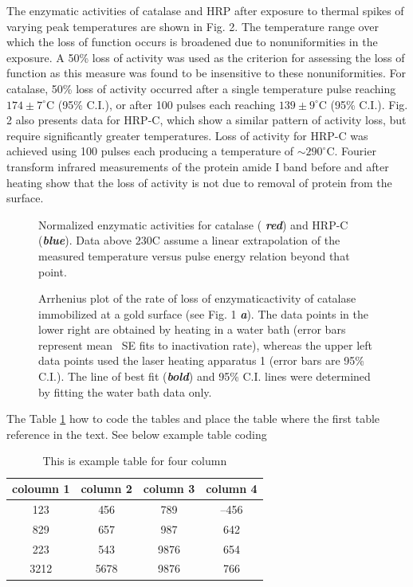 \documentclass{biophys}
\begin{document}
The enzymatic activities of catalase and HRP after exposure to thermal spikes of varying peak temperatures are shown in Fig. 2. The temperature range over which the loss of function occurs is broadened due to nonuniformities in the exposure. A 50\% loss of activity was used as the criterion for assessing the loss of function as this measure was found to be insensitive to these nonuniformities. For catalase, 50\% loss of activity occurred after a single temperature pulse reaching $174\pm 7^\circ$C (95\% C.I.), or after 100 pulses each reaching $139\pm 9^\circ$C (95\% C.I.). Fig. 2 also presents data for HRP-C, which show a similar pattern of activity loss, but require significantly greater temperatures. Loss of activity for HRP-C was achieved using 100 pulses each producing a temperature of ${\sim}290^\circ$C. Fourier transform infrared  measurements of the protein amide I band before and after heating show that the loss of activity is not due to removal of protein from the surface.

\begin{figure}[b!]
\centering{
\rule{2cm}{2cm} %
}
\caption{Normalized enzymatic activities for catalase ({\bfseries\itshape
red}) and HRP-C ({\bfseries\itshape blue}). Data above $\mbox{230}$\textdegree C assume a linear extrapolation of the measured temperature versus pulse energy relation beyond that point.}
\end{figure}

\begin{figure}[t!]
\centering{
\rule{2cm}{2cm} %
}
\caption{Arrhenius plot of the rate of loss of enzymatic\break activity of catalase immobilized at a gold surface (see Fig. 1 {\bfseries\itshape a}). The data points in the lower right are obtained by heating in a water bath (error bars represent mean \textpm\ SE fits to inactivation rate), whereas the upper left data points used the laser heating apparatus 1 (error bars are 95\% C.I.). The line of best fit ({\bfseries\itshape bold}) and 95\% C.I. lines were determined by fitting the water bath data only.
}
\end{figure}

The Table \ref{tab1} how to code the tables and place the table where the first
table reference in the text. See below example table coding

\begin{table}[!bht]
\begin{center}
\caption{This is example table for four column}\label{tab1}
\begin{tabular}{cccc}\hline
coloumn 1 & column 2 & column 3 & column 4\\ \hline
123 & 456 & 789 & --456\\
829 & 657 & 987 & 642\\
223 & 543 & 9876& 654\\
3212 & 5678 & 9876 & 766\\ \hline
\end{tabular}
\end{center}
\end{table}
\end{document}
